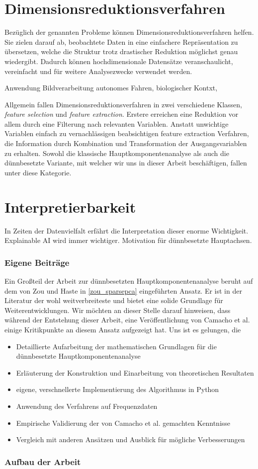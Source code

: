 \section{Dimensionsreduktionsverfahren}

Bezüglich der genannten Probleme können Dimensionsreduktionsverfahren helfen. Sie zielen darauf ab, beobachtete Daten in eine einfachere Repräsentation zu übersetzen, welche die Struktur trotz drastischer Reduktion möglichst genau wiedergibt. Dadurch können hochdimensionale Datensätze veranschaulicht, vereinfacht und für weitere Analysezwecke verwendet werden.

Anwendung Bildverarbeitung autonomes Fahren, biologischer Kontxt, 

Allgemein fallen Dimensionsreduktionsverfahren in zwei verschiedene Klassen, \textit{feature selection} und \textit{feature extraction}. Erstere erreichen eine Reduktion vor allem durch eine Filterung nach relevanten Variablen. Anstatt unwichtige Variablen einfach zu vernachlässigen beabsichtigen feature extraction Verfahren, die Information durch Kombination und Transformation der Ausgangsvariablen zu erhalten. Sowohl die klassische Hauptkomponentenanalyse als auch die dünnbesetzte Variante, mit welcher wir uns in dieser Arbeit beschäftigen, fallen unter diese Kategorie.


\section{Interpretierbarkeit}

In Zeiten der Datenvielfalt erfährt die Interpretation dieser enorme Wichtigkeit. Explainable AI wird immer wichtiger. Motivation für dünnbesetzte Hauptachsen.

\subsubsection{Eigene Beiträge}
Ein Großteil der Arbeit zur dünnbesetzten Hauptkomponentenanalyse beruht auf dem von Zou und Haste in \ref{zou_sparsepca} eingeführten Ansatz. Er ist in der Literatur der wohl weitverbreiteste und bietet eine solide Grundlage für Weiterentwicklungen. Wir möchten an dieser Stelle darauf hinweisen, dass während der Entstehung dieser Arbeit, eine Veröffentlichung von Camacho et al. einige Kritikpunkte an diesem Ansatz aufgezeigt hat. Uns ist es gelungen, die 
\begin{itemize}
\item Detaillierte Aufarbeitung der mathematischen Grundlagen für die dünnbesetzte Hauptkomponentenanalyse
\item Erläuterung der Konstruktion und Einarbeitung von theoretischen Resultaten
\item eigene, verschnellerte Implementierung des Algorithmus in Python
\item Anwendung des Verfahrens auf Frequenzdaten
\item Empirische Validierung der von Camacho et al. gemachten Kenntnisse
\item Vergleich mit anderen Ansätzen und Ausblick für mögliche Verbesserungen
\end{itemize}

\subsubsection{Aufbau der Arbeit}
